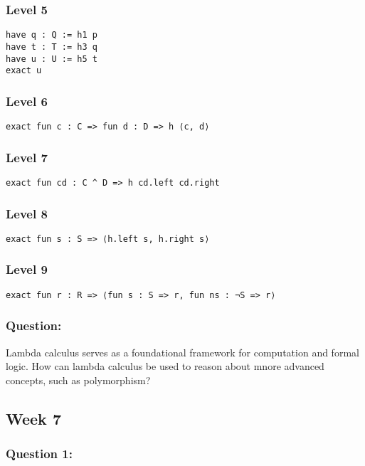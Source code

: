 \documentclass{article}
\theoremstyle{theorem}
\theoremstyle{definition}
\theoremstyle{remark}
\begin{document}
\subsubsection*{Level 5}
\begin{verbatim}
have q : Q := h1 p
have t : T := h3 q
have u : U := h5 t
exact u
\end{verbatim}

\subsubsection*{Level 6}
\begin{verbatim}
exact fun c : C => fun d : D => h ⟨c, d⟩
\end{verbatim}

\subsubsection*{Level 7}
\begin{verbatim}
exact fun cd : C ^ D => h cd.left cd.right
\end{verbatim}

\subsubsection*{Level 8}
\begin{verbatim}
exact fun s : S => ⟨h.left s, h.right s⟩
\end{verbatim}

\subsubsection*{Level 9}
\begin{verbatim}
exact fun r : R => ⟨fun s : S => r, fun ns : ¬S => r⟩
\end{verbatim}

\subsubsection*{Question:}
Lambda calculus serves as a foundational framework for computation and formal logic. How can lambda calculus be used to reason about mnore advanced concepts, such as polymorphism?

\subsection{Week 7}

\subsubsection*{Question 1:}
\end{document}
